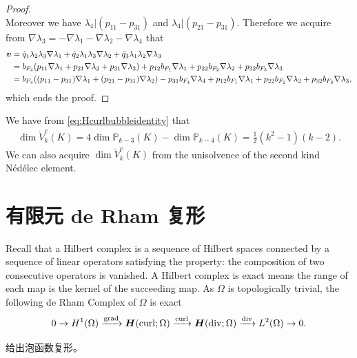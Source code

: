 \begin{proof}
\[\]
Moreover we have $\lambda_4|(p_{11}-p_{31})$ and $\lambda_4|(p_{21}-p_{31})$.
Therefore we acquire from $\nabla\lambda_{3}=-\nabla\lambda_{1}-\nabla\lambda_{2}-\nabla\lambda_{4}$ that
\begin{align*}
\boldsymbol v&=\tilde q_1\lambda_2\lambda_3\nabla\lambda_{1}+\tilde q_2\lambda_1\lambda_3\nabla\lambda_{2}+\tilde q_3\lambda_1\lambda_2\nabla\lambda_{3} \\
&=b_{F_4}(p_{11}\nabla\lambda_{1}+p_{21}\nabla\lambda_{2}+p_{31}\nabla\lambda_{3}) +p_{12}b_{F_1}\nabla\lambda_{1}+p_{22}b_{F_2}\nabla\lambda_{2}+p_{32}b_{F_3}\nabla\lambda_{3} \\
&=b_{F_4}((p_{11}-p_{31})\nabla\lambda_{1}+(p_{21}-p_{31})\nabla\lambda_{2}) - p_{31}b_{F_4}\nabla\lambda_{4} +p_{12}b_{F_1}\nabla\lambda_{1}+p_{22}b_{F_2}\nabla\lambda_{2}+p_{32}b_{F_3}\nabla\lambda_{3},
\end{align*}
which ends the proof.
\end{proof}

We have from \eqref{eq:Hcurlbubbleidentity} that
\begin{align*}
\dim\mathring V_{k}^c(K)=4\dim\mathbb P_{k-3}(K)-\dim\mathbb P_{k-4}(K)=\frac{1}{2}(k^2-1)(k-2).
\end{align*}
We can also acquire $\dim\mathring V_{k}^c(K)$ from the unisolvence of the second kind N\'ed\'elec element.

\section{有限元 de Rham 复形}
Recall that a Hilbert complex is a sequence of Hilbert spaces connected by a sequence of linear operators satisfying the property: the composition of two consecutive operators is vanished. A Hilbert complex is exact means the range of each map is the kernel of the succeeding map. As $\Omega$ is topologically trivial, the following de Rham Complex of $\Omega$ is exact
\begin{equation}\label{eq:derham}
0\xrightarrow{} H^1(\Omega)\xrightarrow{\operatorname{grad}}\boldsymbol H(\operatorname{curl};\Omega)\xrightarrow{\operatorname{curl}}\boldsymbol H(\operatorname{div};\Omega)\xrightarrow{\operatorname{div}}L^2(\Omega) \xrightarrow{}0.
\end{equation}

给出泡函数复形。